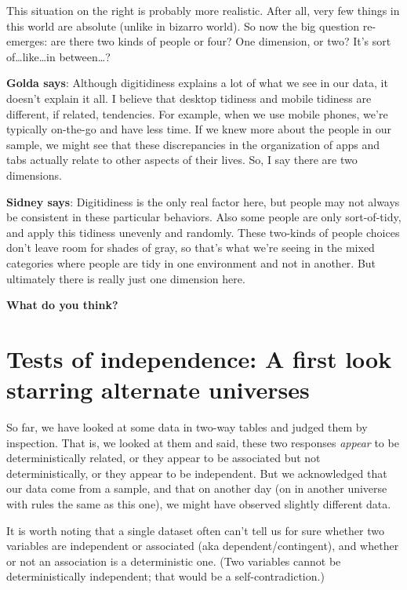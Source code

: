 \documentclass[openany]{book}
\begin{document}
This situation on the right is probably more realistic. After all, very few things in this world are absolute (unlike in bizarro world). So now the big question re-emerges: are there two kinds of people or four? One dimension, or two? It's sort of\ldots{}like\ldots{}in between\ldots{}?

\textbf{Golda says}: Although digitidiness explains a lot of what we see in our data, it doesn't explain it all. I believe that desktop tidiness and mobile tidiness are different, if related, tendencies. For example, when we use mobile phones, we're typically on-the-go and have less time. If we knew more about the people in our sample, we might see that these discrepancies in the organization of apps and tabs actually relate to other aspects of their lives. So, I say there are two dimensions.

\textbf{Sidney says}: Digitidiness is the only real factor here, but people may not always be consistent in these particular behaviors. Also some people are only sort-of-tidy, and apply this tidiness unevenly and randomly. These two-kinds of people choices don't leave room for shades of gray, so that's what we're seeing in the mixed categories where people are tidy in one environment and not in another. But ultimately there is really just one dimension here.

\textbf{What do you think?}

\hypertarget{test-indep}{%
\chapter{Tests of independence: A first look starring alternate universes}\label{test-indep}}

So far, we have looked at some data in two-way tables and judged them by inspection. That is, we looked at them and said, these two responses \emph{appear} to be deterministically related, or they appear to be associated but not deterministically, or they appear to be independent. But we acknowledged that our data come from a sample, and that on another day (on in another universe with rules the same as this one), we might have observed slightly different data.

It is worth noting that a single dataset often can't tell us for sure whether two variables are independent or associated (aka dependent/contingent), and whether or not an association is a deterministic one. (Two variables cannot be deterministically independent; that would be a self-contradiction.)
\end{document}

